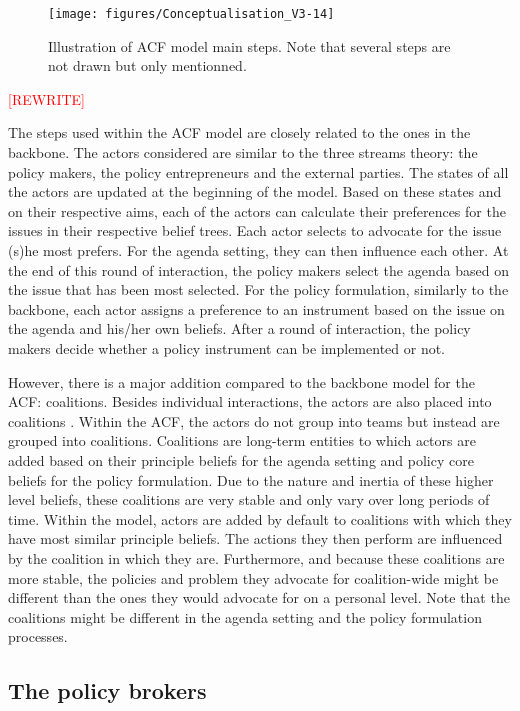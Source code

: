 \begin{figure}
\centering
\texttt{[image: figures/Conceptualisation\_V3-14]}
\caption{Illustration of ACF model main steps. Note that several steps are not drawn but only mentionned.}
\label{fig:Conceptualisation_V3-14}
\end{figure}

\textcolor{red}{[REWRITE]}

The steps used within the ACF model are closely related to the ones in the backbone. The actors considered are similar to the three streams theory: the policy makers, the policy entrepreneurs and the external parties. The states of all the actors are updated at the beginning of the model. Based on these states and on their respective aims, each of the actors can calculate their preferences for the issues in their respective belief trees. Each actor selects to advocate for the issue (s)he most prefers. For the agenda setting, they can then influence each other. At the end of this round of interaction, the policy makers select the agenda based on the issue that has been most selected. For the policy formulation, similarly to the backbone, each actor assigns a preference to an instrument based on the issue on the agenda and his/her own beliefs. After a round of interaction, the policy makers decide whether a policy instrument can be implemented or not.
 
However, there is a major addition compared to the backbone model for the ACF: coalitions. Besides individual interactions, the actors are also placed into coalitions \citep{mintrom1996advocacy}. Within the ACF, the actors do not group into teams but instead are grouped into coalitions. Coalitions are long-term entities to which actors are added based on their principle beliefs for the agenda setting and policy core beliefs for the policy formulation. Due to the nature and inertia of these higher level beliefs, these coalitions are very stable and only vary over long periods of time. Within the model, actors are added by default to coalitions with which they have most similar principle beliefs. The actions they then perform are influenced by the coalition in which they are. Furthermore, and because these coalitions are more stable, the policies and problem they advocate for coalition-wide might be different than the ones they would advocate for on a personal level. Note that the coalitions might be different in the agenda setting and the policy formulation processes.

\subsection{The policy brokers}

